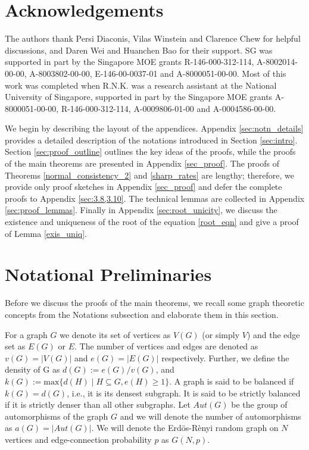 \documentclass[12pt]{article}
\def\er{ Erd{\"o}s-R{\`e}nyi }
\numberwithin{equation}{section}
\begin{document}
\section*{Acknowledgements}
The authors thank Persi Diaconis, Vilas Winstein and Clarence Chew for helpful discussions, and Daren Wei and Huanchen Bao for their support. SG was supported in part by the Singapore MOE grants R-146-000-312-114, A-8002014-00-00, A-8003802-00-00, E-146-00-0037-01 and A-8000051-00-00. Most of this work was completed when R.N.K. was a research assistant at the National University of Singapore, supported in part by the Singapore MOE grants A-8000051-00-00, R-146-000-312-114, A-0009806-01-00 and A-0004586-00-00.





\appendix

We begin by describing the layout of the appendices. Appendix \ref{sec:notn_details} provides a detailed description of the notations introduced in Section \ref{sec:intro}. Section \ref{sec:proof_outline} outlines the key ideas of the proofs, while the proofs of the main theorems are presented in Appendix \ref{sec_proof}. The proofs of Theorems \ref{normal_consistency_2} and \ref{sharp_rates} are lengthy; therefore, we provide only proof sketches in Appendix \ref{sec_proof} and defer the complete proofs to Appendix \ref{sec:3.8,3.10}. The technical lemmas are collected in Appendix \ref{sec:proof_lemmas}. Finally in Appendix \ref{sec:root_unicity}, we discuss the existence and uniqueness of the root of the equation \eqref{root_eqn} and give a proof of Lemma \ref{exis_uniq}.

\section{Notational Preliminaries \label{sec:notn_details}}

Before we discuss the proofs of the main theorems, we recall some graph theoretic concepts from the Notations subsection and elaborate them in this section.

For a graph $G$ we denote its set of vertices as $V(G)$ (or simply $V$) and the edge set as $E(G)$ or $E$. The number of vertices and edges are denoted as $v(G)=|V(G)|$ and $e(G)=|E(G)|$ respectively. Further, we define the density of G as \(d(G) := e(G)/v(G)\), and \(k(G) := \mathrm{max}\{d(H)\mid H\subseteq G, e(H)\geq 1\}\). A graph is said to be balanced if \(k(G) = d(G)\), i.e., it is its densest subgraph. It is said to be strictly balanced if it is strictly denser than all other subgraphs.
Let $Aut(G)$ be the group of automorphisms of the graph $G$ and we will denote the number of automorphisms as $a(G)=|Aut(G)|$. We will denote the \er random graph on $N$ vertices and edge-connection probability $p$ as $G(N,p)$. 
\end{document}
